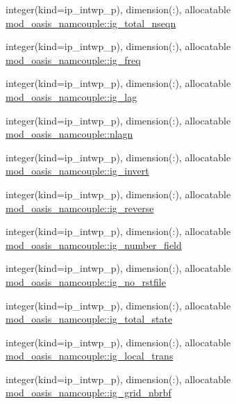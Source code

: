 \begin{DoxyCompactItemize}
\item 
integer(kind=ip\+\_\+intwp\+\_\+p), dimension(\+:), allocatable \hyperlink{namespacemod__oasis__namcouple_a09ed8be682296ef584f0d5777b2c6482}{mod\+\_\+oasis\+\_\+namcouple\+::ig\+\_\+total\+\_\+nseqn}
\item 
integer(kind=ip\+\_\+intwp\+\_\+p), dimension(\+:), allocatable \hyperlink{namespacemod__oasis__namcouple_affa727bb033c0f4d09962f2b4d1b4ab5}{mod\+\_\+oasis\+\_\+namcouple\+::ig\+\_\+freq}
\item 
integer(kind=ip\+\_\+intwp\+\_\+p), dimension(\+:), allocatable \hyperlink{namespacemod__oasis__namcouple_ae2c74692147a54b3f7534301d509f766}{mod\+\_\+oasis\+\_\+namcouple\+::ig\+\_\+lag}
\item 
integer(kind=ip\+\_\+intwp\+\_\+p), dimension(\+:), allocatable \hyperlink{namespacemod__oasis__namcouple_aad06af35c92de78d71671d39bcbb1690}{mod\+\_\+oasis\+\_\+namcouple\+::nlagn}
\item 
integer(kind=ip\+\_\+intwp\+\_\+p), dimension(\+:), allocatable \hyperlink{namespacemod__oasis__namcouple_a0b8948452bbd8cf1dc9f0fccc17c344d}{mod\+\_\+oasis\+\_\+namcouple\+::ig\+\_\+invert}
\item 
integer(kind=ip\+\_\+intwp\+\_\+p), dimension(\+:), allocatable \hyperlink{namespacemod__oasis__namcouple_adc4dcf30da2b88fb1798dd02e7833bc1}{mod\+\_\+oasis\+\_\+namcouple\+::ig\+\_\+reverse}
\item 
integer(kind=ip\+\_\+intwp\+\_\+p), dimension(\+:), allocatable \hyperlink{namespacemod__oasis__namcouple_a0751f74f7ce6520d8e860b9da14d1d9d}{mod\+\_\+oasis\+\_\+namcouple\+::ig\+\_\+number\+\_\+field}
\item 
integer(kind=ip\+\_\+intwp\+\_\+p), dimension(\+:), allocatable \hyperlink{namespacemod__oasis__namcouple_a1cc3d37d7819c112f14b6cec03266561}{mod\+\_\+oasis\+\_\+namcouple\+::ig\+\_\+no\+\_\+rstfile}
\item 
integer(kind=ip\+\_\+intwp\+\_\+p), dimension(\+:), allocatable \hyperlink{namespacemod__oasis__namcouple_a7c783457d0e759e3af98b92146fa4ec3}{mod\+\_\+oasis\+\_\+namcouple\+::ig\+\_\+total\+\_\+state}
\item 
integer(kind=ip\+\_\+intwp\+\_\+p), dimension(\+:), allocatable \hyperlink{namespacemod__oasis__namcouple_a510a13e57f2f65d5ddc70c729d54c0f6}{mod\+\_\+oasis\+\_\+namcouple\+::ig\+\_\+local\+\_\+trans}
\item 
integer(kind=ip\+\_\+intwp\+\_\+p), dimension(\+:), allocatable \hyperlink{namespacemod__oasis__namcouple_ae81f2e658bbaeae20badef0fad425a69}{mod\+\_\+oasis\+\_\+namcouple\+::ig\+\_\+grid\+\_\+nbrbf}

\end{DoxyCompactItemize}

